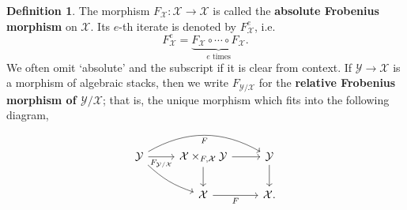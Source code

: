 \documentclass[11pt]{amsart}
\theoremstyle{plain}
\theoremstyle{definition}
\newtheorem{definition}[theorem]{Definition}
\numberwithin{equation}{section}
\numberwithin{theorem}{section}
\begin{document}
\begin{definition}
    \label{def:absolute_Frobenius}
    The morphism $F_{\mathcal{X}} \colon \mathcal{X} \to \mathcal{X}$ is called the \textbf{absolute Frobenius morphism} on $\mathcal{X}$. 
    Its $e$-th iterate is denoted by $F^e_{\mathcal{X}}$, i.e.
    \begin{displaymath}
        F^e_{\mathcal{X}} = \underbrace{F_{\mathcal{X}} \circ \cdots \circ F_{\mathcal{X}}}_{e \textrm{ times}}.
    \end{displaymath}
    We often omit `absolute' and the subscript if it is clear from context. 
    If $\mathcal{Y} \to \mathcal{X}$ is a morphism of algebraic stacks, then we write $F_{\mathcal{Y}/\mathcal{X}}$ for the \textbf{relative Frobenius morphism of $\mathcal{Y}/\mathcal{X}$}; that is, the unique morphism which fits into the following diagram,
    \begin{displaymath}
        \begin{tikzcd}
            {\mathcal{Y}} & {\mathcal{X}\times_{F,\mathcal{X}} \mathcal{Y}} & {\mathcal{Y}} \\
            & {\mathcal{X}} & {\mathcal{X}.}
            \arrow["{F_{\mathcal{Y}/\mathcal{X}}}"', from=1-1, to=1-2]
            \arrow["F"', bend right =-30pt, from=1-1, to=1-3]
            \arrow[bend right =12pt, from=1-1, to=2-2]
            \arrow[from=1-2, to=1-3]
            \arrow[from=1-2, to=2-2]
            \arrow[from=1-3, to=2-3]
            \arrow["F"', from=2-2, to=2-3]
        \end{tikzcd}
    \end{displaymath}
\end{definition}
\end{document}
